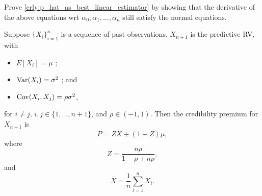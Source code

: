 \documentclass[notoc,notitlepage]{tufte-book}
\begin{document}
\begin{ex}
  Prove \cref{crly:p_hat_as_best_linear_estimator} by showing that the
  derivative of the above equations wrt $\alpha_0, \alpha_1, ..., \alpha_n$
  still satisfy the normal equations.
\end{ex}


\begin{thm}[Theorem 1]\label{thm:theorem_1}
  Suppose $\{ X_i \}_{i=1}^n$ is a sequence of past observations, $X_{n+1}$ is
  the predictive RV, with
  \begin{itemize}
    \item $E[X_i] = \mu$ ;
    \item $\operatorname{Var}(X_i) = \sigma^2$ ; and
    \item $\operatorname{Cov}(X_i, X_j) = \rho \sigma^2$,
  \end{itemize}
  for $i \neq j$, $i, j \in \{ 1, \ldots, n+1 \}$, and $\rho \in (-1, 1)$. Then
  the credibility premium for $X_{n+1}$ is
  \begin{equation*}
    P = Z \overline{X} + (1 - Z) \mu,
  \end{equation*}
  where
  \begin{equation*}
    Z = \frac{n\rho}{1 - \rho + n\rho},
  \end{equation*}
  and
  \begin{equation*}
    \overline{X} = \frac{1}{n} \sum_{i=1}^{n} X_i.
  \end{equation*}
\end{thm}
\end{document}
